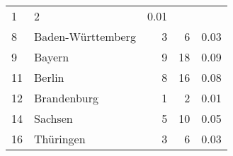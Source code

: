 \begin{longtable}{lXrrr}
       \num{1} &
       \num[round-mode=places,round-precision=2]{2} &
         \num[round-mode=places,round-precision=2]{0,01} \\

     8 &
     \multicolumn{1}{X}{ Baden-Württemberg   } &


       \num{3} &
       \num[round-mode=places,round-precision=2]{6} &
         \num[round-mode=places,round-precision=2]{0,03} \\

     9 &
     \multicolumn{1}{X}{ Bayern   } &


       \num{9} &
       \num[round-mode=places,round-precision=2]{18} &
         \num[round-mode=places,round-precision=2]{0,09} \\

     11 &
     \multicolumn{1}{X}{ Berlin   } &


       \num{8} &
       \num[round-mode=places,round-precision=2]{16} &
         \num[round-mode=places,round-precision=2]{0,08} \\

     12 &
     \multicolumn{1}{X}{ Brandenburg   } &


       \num{1} &
       \num[round-mode=places,round-precision=2]{2} &
         \num[round-mode=places,round-precision=2]{0,01} \\

     14 &
     \multicolumn{1}{X}{ Sachsen   } &


       \num{5} &
       \num[round-mode=places,round-precision=2]{10} &
         \num[round-mode=places,round-precision=2]{0,05} \\

     16 &
     \multicolumn{1}{X}{ Thüringen   } &


       \num{3} &
       \num[round-mode=places,round-precision=2]{6} &
         \num[round-mode=places,round-precision=2]{0,03} \\


\end{longtable}
